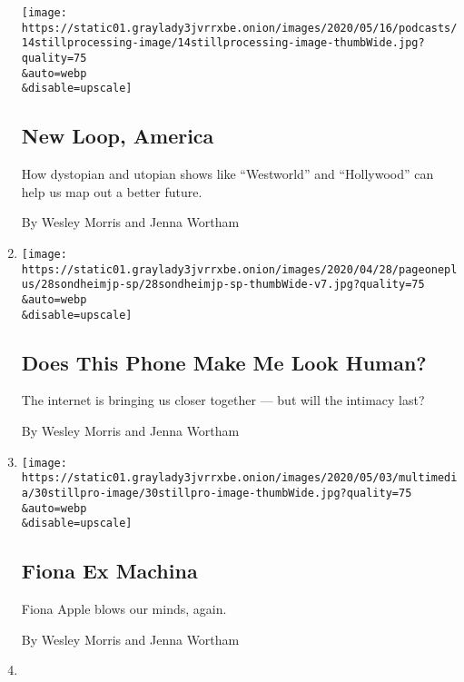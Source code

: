 \begin{enumerate}
  \texttt{[image: https://static01.graylady3jvrrxbe.onion/images/2020/05/16/podcasts/14stillprocessing-image/14stillprocessing-image-thumbWide.jpg?quality=75\\\&auto=webp\\\&disable=upscale]}

  \hypertarget{new-loop-america}{%
  \subsection{New Loop, America}\label{new-loop-america}}

  How dystopian and utopian shows like ``Westworld'' and ``Hollywood''
  can help us map out a better future.

  By Wesley Morris and Jenna Wortham
\item
  \href{/2020/05/07/podcasts/still-processing-internet-vulnerability-sondheim-parks-recreation.html}{}

  \texttt{[image: https://static01.graylady3jvrrxbe.onion/images/2020/04/28/pageoneplus/28sondheimjp-sp/28sondheimjp-sp-thumbWide-v7.jpg?quality=75\\\&auto=webp\\\&disable=upscale]}

  \hypertarget{does-this-phone-make-me-look-human}{%
  \subsection{Does This Phone Make Me Look
  Human?}\label{does-this-phone-make-me-look-human}}

  The internet is bringing us closer together --- but will the intimacy
  last?

  By Wesley Morris and Jenna Wortham
\item
  \href{/2020/04/30/podcasts/still-processing-fiona-apple-fetch-bolt-cutters.html}{}

  \texttt{[image: https://static01.graylady3jvrrxbe.onion/images/2020/05/03/multimedia/30stillpro-image/30stillpro-image-thumbWide.jpg?quality=75\\\&auto=webp\\\&disable=upscale]}

  \hypertarget{fiona-ex-machina}{%
  \subsection{Fiona Ex Machina}\label{fiona-ex-machina}}

  Fiona Apple blows our minds, again.

  By Wesley Morris and Jenna Wortham
\item
  \href{/2020/04/23/podcasts/still-processing-halle-berry-sharon-stone-catwoman-quarantine.html}{}


\end{enumerate}
